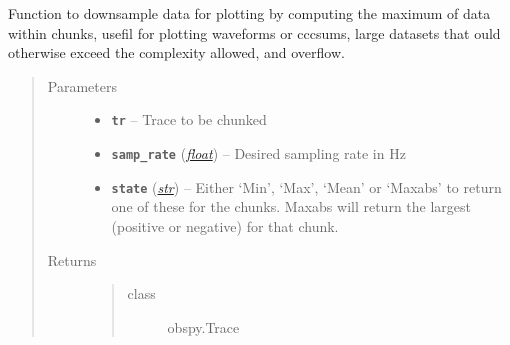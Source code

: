 \documentclass[a4paper,10pt,english]{sphinxmanual}
\begin{document}
\begin{fulllineitems}
\label{utils:EQcorrscan_plotting.chunk_data}
Function to downsample data for plotting by computing the maximum of
data within chunks, usefil for plotting waveforms or cccsums, large datasets
that ould otherwise exceed the complexity allowed, and overflow.
\begin{quote}\begin{description}
\item[{Parameters}] \leavevmode\begin{itemize}
\item {} 
\textbf{\texttt{tr}} -- Trace to be chunked

\item {} 
\textbf{\texttt{samp\_rate}} (\href{https://docs.python.org/library/functions.html\#float}{\emph{float}}) -- Desired sampling rate in Hz

\item {} 
\textbf{\texttt{state}} (\href{https://docs.python.org/library/functions.html\#str}{\emph{str}}) -- Either `Min', `Max', `Mean' or `Maxabs' to return one of            these for the chunks. Maxabs will return the largest (positive or            negative) for that chunk.

\end{itemize}

\item[{Returns}] \leavevmode
\begin{quote}\begin{description}
\item[{class}] \leavevmode
obspy.Trace

\end{description}\end{quote}


\end{description}\end{quote}

\end{fulllineitems}

\end{document}
